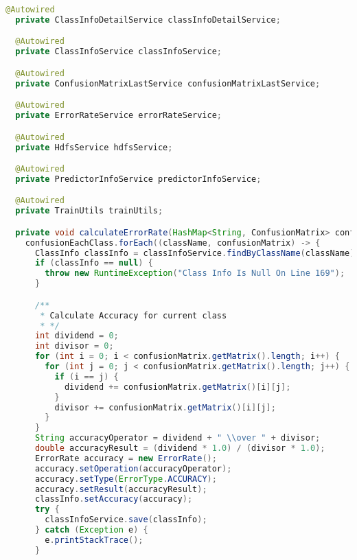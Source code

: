 \begin{lstlisting}[language=Java,basicstyle=\tiny,caption=TestingController.java]
  @Autowired
  private ClassInfoDetailService classInfoDetailService;

  @Autowired
  private ClassInfoService classInfoService;

  @Autowired
  private ConfusionMatrixLastService confusionMatrixLastService;

  @Autowired
  private ErrorRateService errorRateService;

  @Autowired
  private HdfsService hdfsService;

  @Autowired
  private PredictorInfoService predictorInfoService;

  @Autowired
  private TrainUtils trainUtils;

  private void calculateErrorRate(HashMap<String, ConfusionMatrix> confusionEachClass) {
    confusionEachClass.forEach((className, confusionMatrix) -> {
      ClassInfo classInfo = classInfoService.findByClassName(className);
      if (classInfo == null) {
        throw new RuntimeException("Class Info Is Null On Line 169");
      }

      /**
       * Calculate Accuracy for current class
       * */
      int dividend = 0;
      int divisor = 0;
      for (int i = 0; i < confusionMatrix.getMatrix().length; i++) {
        for (int j = 0; j < confusionMatrix.getMatrix().length; j++) {
          if (i == j) {
            dividend += confusionMatrix.getMatrix()[i][j];
          }
          divisor += confusionMatrix.getMatrix()[i][j];
        }
      }
      String accuracyOperator = dividend + " \\over " + divisor;
      double accuracyResult = (dividend * 1.0) / (divisor * 1.0);
      ErrorRate accuracy = new ErrorRate();
      accuracy.setOperation(accuracyOperator);
      accuracy.setType(ErrorType.ACCURACY);
      accuracy.setResult(accuracyResult);
      classInfo.setAccuracy(accuracy);
      try {
        classInfoService.save(classInfo);
      } catch (Exception e) {
        e.printStackTrace();
      }


\end{lstlisting}
